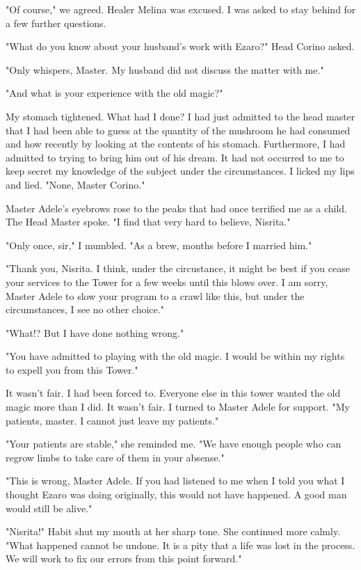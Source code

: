 \documentclass{article}
\begin{document}
"Of course," we agreed. Healer Melina was excused. I was asked to stay behind for a few further questions.

"What do you know about your husband's work with Ezaro?" Head Corino asked.

"Only whispers, Master. My husband did not discuss the matter with me." 

"And what is your experience with the old magic?"

My stomach tightened. What had I done? I had just admitted to the head master that I had been able to guess at the quantity of the mushroom he had consumed and how recently by looking at the contents of his stomach. Furthermore, I had admitted to trying to bring him out of his dream. It had not occurred to me to keep secret my knowledge of the subject under the circumstances. I licked my lips and lied. "None, Master Corino."

Master Adele's eyebrows rose to the peaks that had once terrified me as a child. The Head Master spoke. "I find that very hard to believe, Nisrita."

"Only once, sir," I mumbled. "As a brew, months before I married him."

"Thank you, Nisrita. I think, under the circustance, it might be best if you cease your services to the Tower for a few weeks until this blows over. I am sorry, Master Adele to slow your program to a crawl like this, but under the circumstances, I see no other choice."

"What!? But I have done nothing wrong."

"You have admitted to playing with the old magic. I would be within my rights to expell you from this Tower."

It wasn't fair. I had been forced to. Everyone else in this tower wanted the old magic more than I did. It wasn't fair. I turned to Master Adele for support. "My patients, master. I cannot just leave my patients."

"Your patients are stable," she reminded me. "We have enough people who can regrow limbs to take care of them in your absense." 

"This is wrong, Master Adele. If you had listened to me when I told you what I thought Ezaro was doing originally, this would not have happened. A good man would still be alive."

"Nisrita!" Habit shut my mouth at her sharp tone. She continued more calmly. "What happened cannot be undone. It is a pity that a life was lost in the process. We will work to fix our errors from this point forward."
\end{document}
